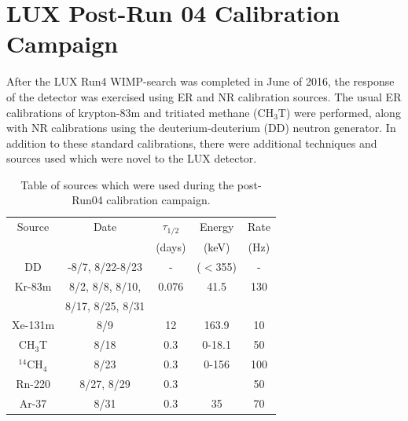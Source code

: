 \chapter{LUX Post-Run 04 Calibration Campaign}
After the LUX Run4 WIMP-search was completed in June of 2016, the response of the detector was exercised using ER and NR calibration sources. The usual ER calibrations of krypton-83m\cite{lux_kr1,lux_kr2} and tritiated methane (CH$_3$T)\cite{lux_tritium} were performed, along with NR calibrations using the deuterium-deuterium (DD) neutron generator\cite{lux_dd1,lux_dd2}. In addition to these standard calibrations, there were additional techniques and sources used which were novel to the LUX detector. 


\begin{table}
\centering
    \begin{tabular}{ c | c | c | c | c }
    \hline
    Source & Date & $\tau_{1/2}$  & Energy & Rate \\ 
     &  & (days) & (keV) & (Hz) \\
    \hline \hline
    DD & -8/7, 8/22-8/23  & - & ($<$355) & - \\ 
    \hline
    Kr-83m & 8/2, 8/8, 8/10,  & 0.076 & 41.5  & 130\\ 
     & 8/17, 8/25, 8/31 & & &\\
    \hline
    Xe-131m & 8/9 & 12 & 163.9 & 10 \\ 
    \hline
    CH$_3$T & 8/18 & 0.3 & 0-18.1 & 50 \\ 
    \hline
    $^{14}$CH$_4$ & 8/23 & 0.3 & 0-156 & 100 \\ 
    \hline
    Rn-220 & 8/27, 8/29 & 0.3 & & 50 \\ 
    \hline
    Ar-37 & 8/31 & 0.3 & 35 & 70 \\ 
    \hline
    \hline
    \end{tabular}
    \caption{Table of sources which were used during the post-Run04 calibration campaign.}
\end{table}

